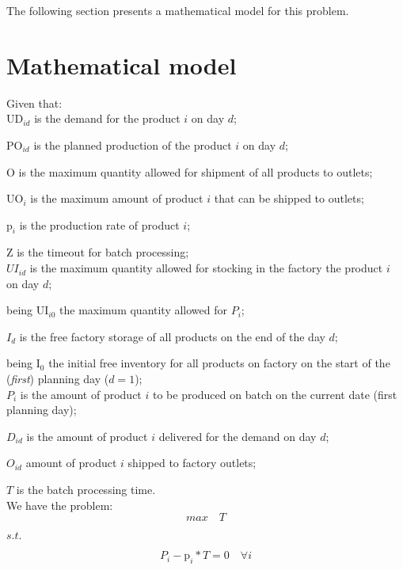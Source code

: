 \documentclass[authoryear,preprint,12pt]{elsarticle}
\begin{document}
The following section presents a mathematical model for this problem.

\section{Mathematical model}
\label{sec:mathModel}

Given that: \\

$\textrm{UD}_{id}$ is the demand for the product $i$ on day $d$;

$\textrm{PO}_{id}$ is the planned production of the product $i$ on day $d$;

$\textrm{O}$ is the maximum quantity allowed for shipment of all products to outlets;

$\textrm{UO}_i$ is the maximum amount of product $i$ that can be shipped to outlets;

$\textrm{p}_i$ is the production rate of product $i$;

$\textrm{Z}$ is the timeout for batch processing; \\

$UI_{id}$ is the maximum quantity allowed for stocking in the factory the product $i$ on day $d$;

being $\textrm{UI}_{i0}$ the maximum quantity allowed for $P_i$;

$I_{d}$ is the free factory storage of all products on the end of the day $d$;

being $\textrm{I}_{0}$ the initial free inventory for all products on factory on the start of the (\emph{first}) planning day ($d=1$); \\

$P_i$ is the amount of product $i$ to be produced on batch on the current date (first planning day);

$D_{id}$ is the amount of product $i$ delivered for the demand on day $d$;

$O_{id}$ amount of product $i$ shipped to factory outlets;

$T$ is the batch processing time. \\

We have the problem: \\

\begin{equation}
max \quad T
\end{equation}

$s.t.$

\begin{equation}
P_i - \textrm{p}_i * T  = 0 \quad \forall i
\end{equation}
\end{document}
